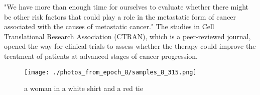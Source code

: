 \documentclass{article}%
\begin{document}
"We have more than enough time for ourselves to evaluate whether there might be other risk factors that could play a role in the metastatic form of cancer associated with the causes of metastatic cancer."\newline%
The studies in Cell Translational Research Association (CTRAN), which is a peer{-}reviewed journal, opened the way for clinical trials to assess whether the therapy could improve the treatment of patients at advanced stages of cancer progression.\newline%

%


\begin{figure}[h!]%
\centering%
\texttt{[image: ./photos\_from\_epoch\_8/samples\_8\_315.png]}%
\caption{a woman in a white shirt and a red tie}%
\end{figure}

%
\end{document}
